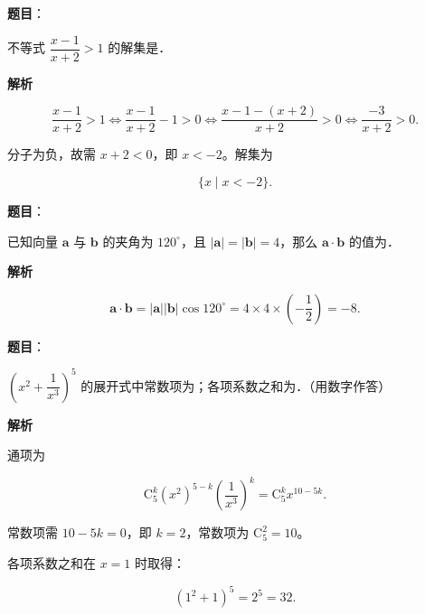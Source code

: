\begin{answer}

\textbf{题目}：

不等式 $\dfrac{x-1}{x+2}>1$ 的解集是\gkblank{}．

\textbf{解析}

\nopagebreak[4]
\[\frac{x-1}{x+2}>1\iff\frac{x-1}{x+2}-1>0\iff\frac{x-1-(x+2)}{x+2}>0\iff\frac{-3}{x+2}>0 .\]

分子为负，故需 $x+2<0$，即 $x<-2$。解集为

\nopagebreak[4]
\[\{x\mid x<-2\}.\]


\end{answer}
\begin{answer}

\textbf{题目}：

已知向量 $\boldsymbol a$ 与 $\boldsymbol b$ 的夹角为 $120^\circ$，且 $|\boldsymbol a|=|\boldsymbol b|=4$，那么 $\boldsymbol a\cdot\boldsymbol b$ 的值为\gkblank{}．

\textbf{解析}

\nopagebreak[4]
\[\boldsymbol a\cdot\boldsymbol b=|\boldsymbol a||\boldsymbol b|\cos120^\circ=4\times4\times\left(-\frac12\right)=-8 .\]


\end{answer}
\begin{answer}

\textbf{题目}：

$\left(x^2+\dfrac1{x^3}\right)^5$ 的展开式中常数项为\gkblank{}；各项系数之和为\gkblank{}．（用数字作答）

\textbf{解析}

通项为

\nopagebreak[4]
\[\mathrm C_5^k(x^2)^{5-k}\left(\frac1{x^3}\right)^k=\mathrm C_5^k x^{10-5k}.\]

常数项需 $10-5k=0$，即 $k=2$，常数项为 $\mathrm C_5^2=10$。

各项系数之和在 $x=1$ 时取得：

\nopagebreak[4]
\[(1^2+1)^5=2^5=32 .\]


\end{answer}
